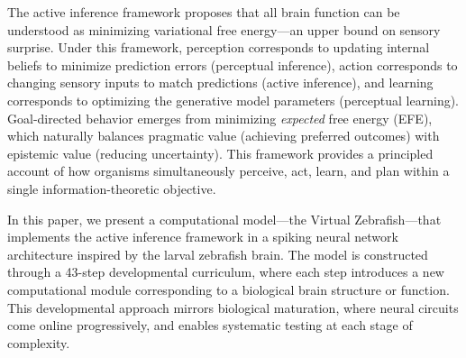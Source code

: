 \documentclass[12pt]{article}
\begin{document}
The active inference framework \citep{friston2010,friston2017,parr2022}
proposes that all brain function can be understood as minimizing
variational free energy---an upper bound on sensory surprise.
Under this framework, perception corresponds to updating internal
beliefs to minimize prediction errors (perceptual inference), action
corresponds to changing sensory inputs to match predictions (active
inference), and learning corresponds to optimizing the generative model
parameters (perceptual learning).
Goal-directed behavior emerges from minimizing \emph{expected} free
energy (EFE), which naturally balances pragmatic value (achieving
preferred outcomes) with epistemic value (reducing uncertainty).
This framework provides a principled account of how organisms
simultaneously perceive, act, learn, and plan within a single
information-theoretic objective.

In this paper, we present a computational model---the Virtual
Zebrafish---that implements the active inference framework in a
spiking neural network architecture inspired by the larval zebrafish
brain.
The model is constructed through a 43-step developmental curriculum,
where each step introduces a new computational module corresponding
to a biological brain structure or function.
This developmental approach mirrors biological maturation, where neural
circuits come online progressively, and enables systematic testing at
each stage of complexity.
\end{document}
